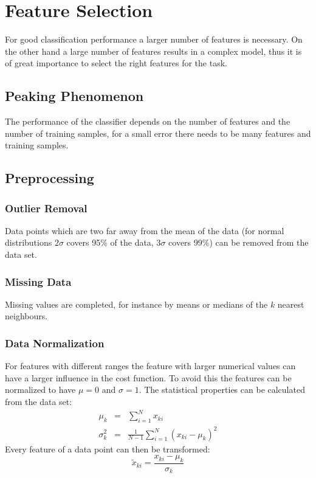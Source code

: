 \chapter{Feature Selection}
For good classification performance a larger number of features is necessary. On the other hand a large number of features results in a complex model, thus it is of great importance to select the right features for the task.

\section{Peaking Phenomenon}
The performance of the classifier depends on the number of features and the number of training samples, for a small error there needs to be many features and training samples.

\section{Preprocessing}
\subsection{Outlier Removal}
Data points which are two far away from the mean of the data (for normal distributions $2 \sigma$ covers 95\% of the data, $3\sigma$ covers 99\%) can be removed from the data set.

\subsection{Missing Data}
Missing values are completed, for instance by means or medians of the $k$ nearest neighbours.

\subsection{Data Normalization}
For features with different ranges the feature with larger numerical values can have a larger influence in the cost function. To avoid this the features can be normalized to have $\mu=0$ and $\sigma=1$.
The statistical properties can be calculated from the data set:
\begin{eqnarray*}
    \mu_k &=& \sum_{i=1}^N x_{ki} \\
    \sigma_k^2 &=& \frac{1}{N-1} \sum_{i=1}^N {(x_{ki} - \mu_k)}^2
\end{eqnarray*}
Every feature of a data point can then be transformed:
\begin{equation*}
    \tilde{x}_{ki} = \frac{x_{ki} - \mu_{k}}{\sigma_k}
\end{equation*}

